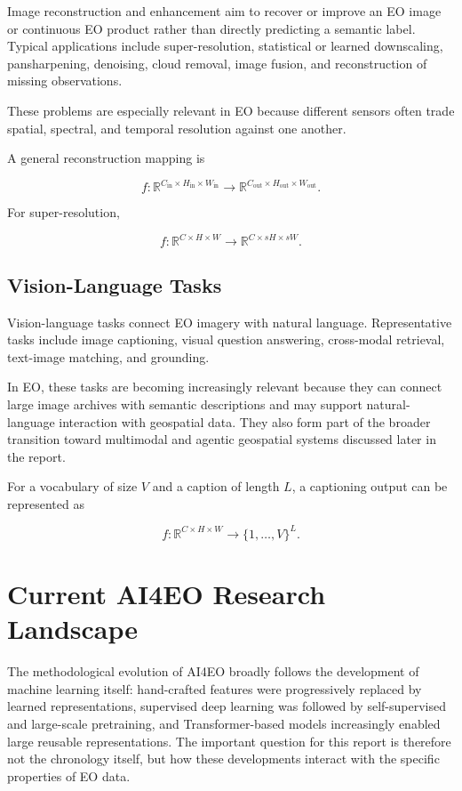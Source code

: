 \documentclass[
    11pt,
    a4paper,
    parskip=half,
    bibliography=totoc,
    numbers=noenddot
]{scrartcl}
\begin{document}
Image reconstruction and enhancement aim to recover or improve an EO
image or continuous EO product rather than directly predicting a
semantic label. Typical applications include super-resolution,
statistical or learned downscaling, pansharpening, denoising, cloud
removal, image fusion, and reconstruction of missing observations.

These problems are especially relevant in EO because different sensors
often trade spatial, spectral, and temporal resolution against one
another.

A general reconstruction mapping is

\[
f:
\mathbb{R}^{C_{\mathrm{in}}\times H_{\mathrm{in}}\times W_{\mathrm{in}}}
\rightarrow
\mathbb{R}^{C_{\mathrm{out}}\times H_{\mathrm{out}}\times W_{\mathrm{out}}}.
\]

For super-resolution,

\[
f:
\mathbb{R}^{C\times H\times W}
\rightarrow
\mathbb{R}^{C\times sH\times sW}.
\]

\subsection{Vision-Language Tasks}

Vision-language tasks connect EO imagery with natural language.
Representative tasks include image captioning, visual question answering,
cross-modal retrieval, text-image matching, and grounding.

In EO, these tasks are becoming increasingly relevant because they can
connect large image archives with semantic descriptions and may support
natural-language interaction with geospatial data. They also form part
of the broader transition toward multimodal and agentic geospatial
systems discussed later in the report.

For a vocabulary of size \(V\) and a caption of length \(L\), a captioning
output can be represented as

\[
f:
\mathbb{R}^{C\times H\times W}
\rightarrow
\{1,\ldots,V\}^{L}.
\]

\section{Current AI4EO Research Landscape}

The methodological evolution of AI4EO broadly follows the development of
machine learning itself: hand-crafted features were progressively
replaced by learned representations, supervised deep learning was
followed by self-supervised and large-scale pretraining, and
Transformer-based models increasingly enabled large reusable
representations. The important question for this report is therefore not
the chronology itself, but how these developments interact with the
specific properties of EO data.
\end{document}
